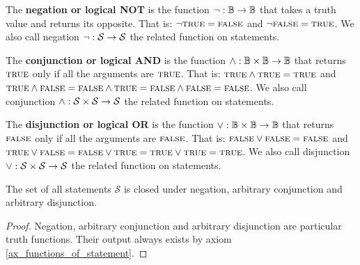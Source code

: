 \documentclass[11pt,letterpaper,fleqn]{memoir} %
\begin{document}
\begin{mathSection}
	\begin{defn}
		The \textbf{negation or logical NOT} is the function $\neg : \mathbb{B} \to \mathbb{B}$ that takes a truth value and returns its opposite. That is: $\neg \textsc{true} = \textsc{false}$ and $\neg \textsc{false} = \textsc{true}$. We also call negation $\neg: \mathcal{S} \to \mathcal{S}$ the related function on statements.
	\end{defn}
	
	\begin{defn}
		The \textbf{conjunction or logical AND} is the function $\wedge : \mathbb{B} \times \mathbb{B} \to \mathbb{B}$ that returns $\textsc{true}$ only if all the arguments are $\textsc{true}$. That is: $\textsc{true} \wedge \textsc{true} = \textsc{true}$ and $\textsc{true} \wedge \textsc{false} =\textsc{false} \wedge \textsc{true} =\textsc{false} \wedge \textsc{false} = \textsc{false}$. We also call conjunction $\wedge : \mathcal{S} \times \mathcal{S} \to \mathcal{S}$ the related function on statements.
	\end{defn}
	
	\begin{defn}
		The \textbf{disjunction or logical OR} is the function $\vee : \mathbb{B} \times \mathbb{B} \to \mathbb{B}$ that returns $\textsc{false}$ only if all the arguments are $\textsc{false}$. That is: $\textsc{false} \vee \textsc{false} = \textsc{false}$ and $\textsc{true} \vee \textsc{false} =\textsc{false} \vee \textsc{true} =\textsc{true} \vee \textsc{true} = \textsc{true}$.  We also call disjunction $\vee : \mathcal{S} \times \mathcal{S} \to \mathcal{S}$ the related function on statements.
	\end{defn}

	\begin{prop}
	The set of all statements $\mathcal{S}$ is closed under negation, arbitrary conjunction and arbitrary disjunction.
\end{prop}
\begin{proof}
	Negation, arbitrary conjunction and arbitrary disjunction are particular truth functions. Their output always exists by axiom \eqref{ax_functions_of_statement}.
\end{proof}\end{mathSection}
\end{document}
